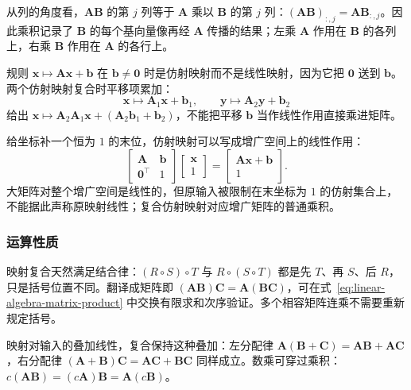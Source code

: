 从列的角度看，$\bm A\bm B$ 的第 $j$ 列等于 $\bm A$ 乘以 $\bm B$ 的第 $j$ 列：$(\bm A\bm B)_{:,j}=\bm A\bm B_{:,j}$。因此乘积记录了 $\bm B$ 的每个基向量像再经 $\bm A$ 传播的结果；左乘 $\bm A$ 作用在 $\bm B$ 的各列上，右乘 $\bm B$ 作用在 $\bm A$ 的各行上。

规则 $\bm x\mapsto\bm A\bm x+\bm b$ 在 $\bm b\neq\bm0$ 时是仿射映射而不是线性映射，因为它把 $\bm0$ 送到 $\bm b$。两个仿射映射复合时平移项累加：
\[
 \bm x\mapsto\bm A_1\bm x+\bm b_1,\qquad
 \bm y\mapsto\bm A_2\bm y+\bm b_2
 \]
给出 $\bm x\mapsto\bm A_2\bm A_1\bm x+(\bm A_2\bm b_1+\bm b_2)$，不能把平移 $\bm b$ 当作线性作用直接乘进矩阵。

给坐标补一个恒为 $1$ 的末位，仿射映射可以写成增广空间上的线性作用：
\begin{equation}
 \begin{bmatrix}\bm A&\bm b\\ \bm0^\top&1\end{bmatrix}
 \begin{bmatrix}\bm x\\1\end{bmatrix}
 =
 \begin{bmatrix}\bm A\bm x+\bm b\\1\end{bmatrix}.
 \label{eq:ls-affine-homogeneous}
\end{equation}
大矩阵对整个增广空间是线性的，但原输入被限制在末坐标为 $1$ 的仿射集合上，不能据此声称原映射线性；复合仿射映射对应增广矩阵的普通乘积。

\subsubsection{运算性质}

\label{sec:linear-algebra-map-composition}

映射复合天然满足结合律：$(R\circ S)\circ T$ 与 $R\circ(S\circ T)$ 都是先 $T$、再 $S$、后 $R$，只是括号位置不同。翻译成矩阵即 $(\bm A\bm B)\bm C=\bm A(\bm B\bm C)$，可在式~\eqref{eq:linear-algebra-matrix-product} 中交换有限求和次序验证。多个相容矩阵连乘不需要重新规定括号。

映射对输入的叠加线性，复合保持这种叠加：左分配律 $\bm A(\bm B+\bm C)=\bm A\bm B+\bm A\bm C$，右分配律 $(\bm A+\bm B)\bm C=\bm A\bm C+\bm B\bm C$ 同样成立。数乘可穿过乘积：$c(\bm A\bm B)=(c\bm A)\bm B=\bm A(c\bm B)$。

